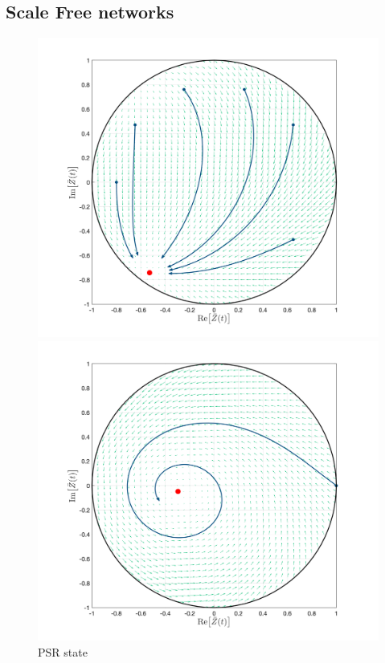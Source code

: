 \subsection{Scale Free networks}
\begin{figure}[H]
  \includegraphics[width=\linewidth, trim={2cm 1cm 2cm 1.5cm },clip]{../Figures/MFOARPSR_scalefree.png}
  \caption{PSR state}\label{fig:MFRPSR}
\endminipage\hfill
{}
  \includegraphics[width=\linewidth, trim={2cm 1cm 2cm 1.5cm },clip]{../Figures/MFOARPSS_scalefree.png}

\end{figure}
